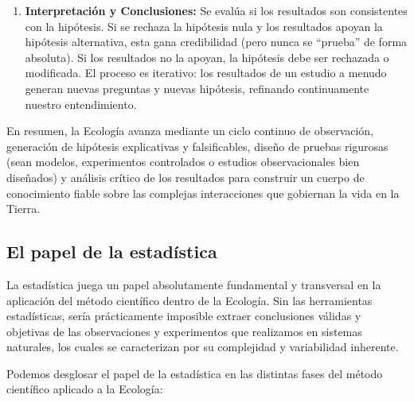 \documentclass[
]{book}
\begin{document}
\begin{enumerate}
\item
  \textbf{Interpretación y Conclusiones:} Se evalúa si los resultados son consistentes con la hipótesis. Si se rechaza la hipótesis nula y los resultados apoyan la hipótesis alternativa, esta gana credibilidad (pero nunca se ``prueba'' de forma absoluta). Si los resultados no la apoyan, la hipótesis debe ser rechazada o modificada. El proceso es iterativo: los resultados de un estudio a menudo generan nuevas preguntas y nuevas hipótesis, refinando continuamente nuestro entendimiento.
\end{enumerate}

En resumen, la Ecología avanza mediante un ciclo continuo de observación, generación de hipótesis explicativas y falsificables, diseño de pruebas rigurosas (sean modelos, experimentos controlados o estudios observacionales bien diseñados) y análisis crítico de los resultados para construir un cuerpo de conocimiento fiable sobre las complejas interacciones que gobiernan la vida en la Tierra.

\subsection*{El papel de la estadística}\label{estad}

La estadística juega un papel absolutamente fundamental y transversal en la aplicación del método científico dentro de la Ecología. Sin las herramientas estadísticas, sería prácticamente imposible extraer conclusiones válidas y objetivas de las observaciones y experimentos que realizamos en sistemas naturales, los cuales se caracterizan por su complejidad y variabilidad inherente.

Podemos desglosar el papel de la estadística en las distintas fases del método científico aplicado a la Ecología:
\end{document}
